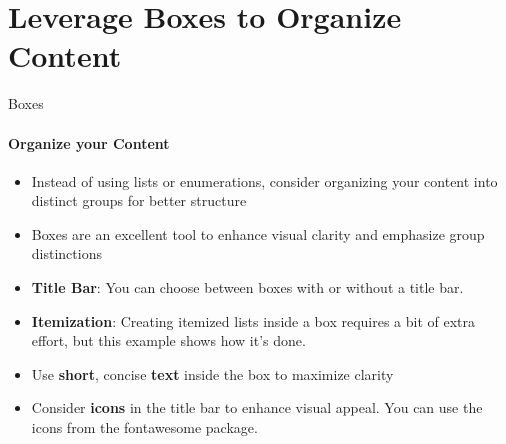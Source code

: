 \documentclass[aspectratio=169]{beamer}
\begin{document}
\section{Leverage \textbf{Boxes} to Organize Content}

\begin{frame}
\end{frame}


\begin{frame}{Boxes}
    \framesubtitle{Organize your Content}
    \begin{coloredblock}[yellow]
        \begin{itemize}
            \item Instead of using lists or enumerations, consider organizing your content into distinct groups for better structure
            \item Boxes are an excellent tool to enhance visual clarity and emphasize group distinctions
        \end{itemize}
    \end{coloredblock}

    \begin{minipage}[t]{0.49\textwidth}
        \begin{coloredblock}
                \begin{itemize}
                    \item \textbf{Title Bar}: You can choose between boxes with or without a title bar.
                    \item \textbf{Itemization}: Creating itemized lists inside a box requires a bit of extra effort, but this example shows how it's done.
                \end{itemize}
        \end{coloredblock}
    \end{minipage}
    \hfill
    \begin{minipage}[t]{0.49\textwidth}
        \begin{coloredblock}
            \begin{itemize}
                \item Use \textbf{short}, concise \textbf{text} inside the box to maximize clarity
                \item Consider \textbf{icons} in the title bar to enhance visual appeal. You can use the icons from the fontawesome package.
            \end{itemize}
        \end{coloredblock}
    \end{minipage}
\end{frame}
\end{document}
